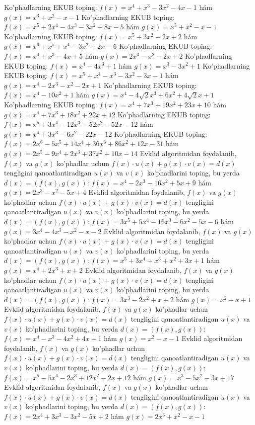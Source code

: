 Ko’phadlarning EKUB toping:  $f(x)=x^4+x^3-3 x^2-4 x-1$ hám $g(x)=x^3+x^2-x-1$
Ko’phadlarning EKUB toping:  $f(x)=x^5+2 x^4-4 x^3-3 x^2+8 x-5$ hám $g(x)=x^5+x^2-x-1$
Ko’phadlarning EKUB toping:  $f(x)=x^5+3 x^2-2 x+2$ hám $g(x)=x^6+x^5+x^4-3 x^2+2 x-6$
Ko’phadlarning EKUB toping:  $f(x)=x^4+x^3-4 x+5$ hám $g(x)=2 x^3-x^2-2 x+2$
Ko’phadlarning EKUB toping:  $f(x)=x^4-4 x^3+1$ hám $g(x)=x^3-3 x^2+1$
Ko’phadlarning EKUB toping: $f(x)=x^5+x^4-x^3-3 x^2-3 x-1$ hám $g(x)=x^4-2 x^3-x^2-2 x+1$
Ko’phadlarning EKUB toping:  $f(x)=x^4-10 x^2+1$ hám $g(x)=x^4-4 \sqrt{2} x^3+6 x^2+4 \sqrt{2} x+1$
Ko’phadlarning EKUB toping:  $f(x)=x^4+7 x^3+19 x^2+23 x+10$ hám $g(x)=x^4+7 x^3+18 x^2+22 x+12$
Ko’phadlarning EKUB toping:  $f(x)=x^5+3 x^4-12 x^3-52 x^2-52 x-12$ hám $g(x)=x^4+3 x^3-6 x^2-22 x-12$
Ko’phadlarning EKUB toping:  $f(x)=2 x^6-5 x^5+14 x^4+36 x^3+86 x^2+12 x-31$ hám $g(x)=2 x^5-9 x^4+2 x^3+37 x^2+10 x-14$
Evklid algoritmidan foydalanib, $f(x)$ va $g(x)$ ko’phadlar uchun $f(x) \cdot u(x)+g(x) \cdot v(x)=d(x)$ tengligini qanoatlantiradigan $u(x)$ va $v(x)$ ko’phadlarini toping, bu yerda $d(x)=(f(x), g(x))$:  $f(x)=x^4-2 x^3-16 x^2+5 x+9$ hám $g(x)=2 x^3-x^2-5 x+4$
Evklid algoritmidan foydalanib, $f(x)$ va $g(x)$ ko’phadlar uchun $f(x) \cdot u(x)+g(x) \cdot v(x)=d(x)$ tengligini qanoatlantiradigan $u(x)$ va $v(x)$ ko’phadlarini toping, bu yerda $d(x)=(f(x), g(x))$:  $f(x)=3 x^5+5 x^4-16 x^3-6 x^2-5 x-6$ hám $g(x)=3 x^4-4 x^3-x^2-x-2$
Evklid algoritmidan foydalanib, $f(x)$ va $g(x)$ ko’phadlar uchun $f(x) \cdot u(x)+g(x) \cdot v(x)=d(x)$ tengligini qanoatlantiradigan $u(x)$ va $v(x)$ ko’phadlarini toping, bu yerda $d(x)=(f(x), g(x))$:  $f(x)=x^5+3 x^4+x^3+x^2+3 x+1$ hám $g(x)=x^4+2 x^3+x+2$
Evklid algoritmidan foydalanib, $f(x)$ va $g(x)$ ko’phadlar uchun $f(x) \cdot u(x)+g(x) \cdot v(x)=d(x)$ tengligini qanoatlantiradigan $u(x)$ va $v(x)$ ko’phadlarini toping, bu yerda $d(x)=(f(x), g(x))$:  $f(x)=3 x^3-2 x^2+x+2$ hám $g(x)=x^2-x+1$
Evklid algoritmidan foydalanib, $f(x)$ va $g(x)$ ko’phadlar uchun $f(x) \cdot u(x)+g(x) \cdot v(x)=d(x)$ tengligini qanoatlantiradigan $u(x)$ va $v(x)$ ko’phadlarini toping, bu yerda $d(x)=(f(x), g(x))$:  $f(x)=x^4-x^3-4 x^2+4 x+1$ hám $g(x)=x^2-x-1$
Evklid algoritmidan foydalanib, $f(x)$ va $g(x)$ ko’phadlar uchun $f(x) \cdot u(x)+g(x) \cdot v(x)=d(x)$ tengligini qanoatlantiradigan $u(x)$ va $v(x)$ ko’phadlarini toping, bu yerda $d(x)=(f(x), g(x))$:  $f(x)=x^5-5 x^4-2 x^3+12 x^2-2 x+12$ hám $g(x)=x^3-5 x^2-3 x+17$
Evklid algoritmidan foydalanib, $f(x)$ va $g(x)$ ko’phadlar uchun $f(x) \cdot u(x)+g(x) \cdot v(x)=d(x)$ tengligini qanoatlantiradigan $u(x)$ va $v(x)$ ko’phadlarini toping, bu yerda $d(x)=(f(x), g(x))$:  $f(x)=2 x^4+3 x^3-3 x^2-5 x+2$ hám $g(x)=2 x^3+x^2-x-1$
